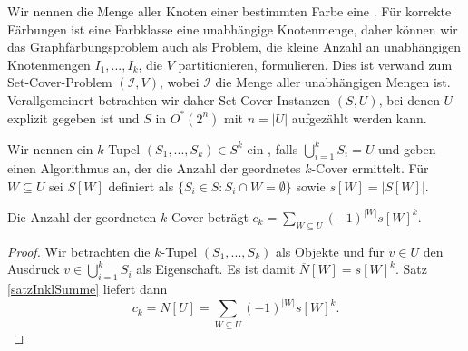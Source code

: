   Wir nennen die Menge aller Knoten einer bestimmten Farbe eine . Für korrekte Färbungen ist eine Farbklasse eine unabhängige Knotenmenge, daher können wir das Graphfärbungsproblem auch als Problem, die kleine Anzahl an unabhängigen Knotenmengen \(I_1,...,I_k\), die \(V\) partitionieren, formulieren. Dies ist verwand zum Set-Cover-Problem \( (\mathcal{I}, V) \), wobei \(\mathcal{I}\) die Menge aller unabhängigen Mengen ist. Verallgemeinert betrachten wir daher Set-Cover-Instanzen \( (S,U) \), bei denen \(U\) explizit gegeben ist und \(S\) in \(O^*(2^n)\) mit \(n = |U|\) aufgezählt werden kann. 
  
  Wir nennen ein \(k\)-Tupel \( (S_1, ..., S_k) \in S^k\) ein , falls \( \bigcup_{i=1}^k S_i = U \) und geben einen Algorithmus an, der die Anzahl der geordnetes \(k\)-Cover ermittelt. Für \(W \subseteq U\) sei \(S[W]\) definiert als \( \{ S_i \in S : S_i \cap W = \emptyset \} \) sowie \(s[W] = |S[W]|\).
  
  \begin{lemma}
   Die Anzahl der geordneten \(k\)-Cover beträgt \(c_k = \sum_{W \subseteq U} (-1)^{ |W| } s[W]^k\).
  \end{lemma}
  
  \begin{proof}
    Wir betrachten die \(k\)-Tupel \( (S_1, ..., S_k) \) als Objekte und für \(v \in U\) den Ausdruck \(v \in \bigcup_{i=1}^k S_i\) als Eigenschaft. Es ist damit \( \overline{N}[W] = s[W]^k\). Satz \ref{satzInklSumme} liefert dann \[c_k = N[U] = \sum_{W \subseteq U} (-1)^{ |W| } s[W]^k.\]
  \end{proof}








